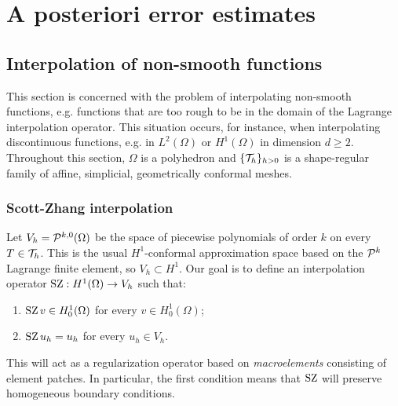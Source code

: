 
\chapter[A posteriori error estimates]{A posteriori error estimates}

\section{Interpolation of non-smooth functions}

This section is concerned with the problem of interpolating non-smooth functions, e.g. functions that are too rough to be in the domain of the Lagrange interpolation operator. This situation occurs, for instance, when interpolating discontinuous functions, e.g. in $L^2(\Omega)$ or $H^1(\Omega)$ in dimension $d \ge 2$.
Throughout this section, $\Omega$ is a polyhedron and $\{\T_h\}_{h>0}$ is a shape-regular family of affine, simplicial, geometrically conformal meshes.


\subsection{Scott-Zhang interpolation}

Let $V_h = \P^{k,0}(\Omega)$ be the space of piecewise polynomials of order $k$ on every $T \in \T_h$. This is the usual $H^1$-conformal approximation space based on the $\P^k$ Lagrange finite element, so $V_h \subset H^1$.
Our goal is to define an interpolation operator $\SZ: H^1(\Omega) \to V_h$ such that:
\begin{enumerate}
    \item $\SZ v \in H^1_0(\Omega)$ for every $v \in H^1_0(\Omega)$;
    \item $\SZ u_h = u_h$ for every $u_h \in V_h$.
\end{enumerate}
This will act as a regularization operator based on \emph{macroelements} consisting of element patches. In particular, the first condition means that $\SZ$ will preserve homogeneous boundary conditions.

